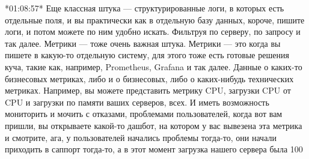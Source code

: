 \documentclass[12pt]{article} %
\begin{document}
*01:08:57*
Еще классная штука — структурированные логи, в которых есть отдельные поля, и вы практически как в отдельную базу данных, короче, пишите логи,  и потом можете по ним удобно искать.  Фильтруя по серверу, по запросу и так далее.  Метрики — тоже очень важная штука.  Метрики — это когда вы пишете в какую-то отдельную систему, для этого тоже есть готовые решения куча, такие как, например, Prometheus, Grafana и так далее.  Данные о каких-то бизнесовых метриках, либо и о бизнесовых, либо о каких-нибудь технических метриках.  Например, вы можете представить метрику CPU, загрузки CPU от CPU и загрузки по памяти ваших серверов, всех.  И иметь возможность мониторить и мочить с отказами, проблемами пользователей, когда вот вам пришли, вы открываете какой-то дашбот, на котором у вас вывезена эта метрика и смотрите, ага, у пользователей начались проблемы тогда-то, они начали приходить в саппорт тогда-то, а в этот момент загрузка нашего сервера была 100%
\end{document}
